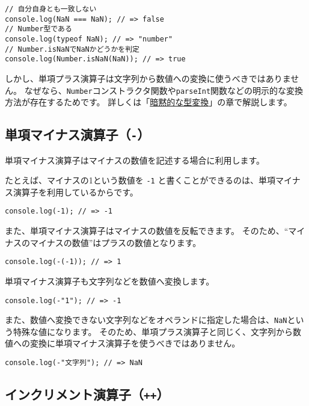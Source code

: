 \begin{lstlisting}
// 自分自身とも一致しない
console.log(NaN === NaN); // => false
// Number型である
console.log(typeof NaN); // => "number"
// Number.isNaNでNaNかどうかを判定
console.log(Number.isNaN(NaN)); // => true
\end{lstlisting}

しかし、単項プラス演算子は文字列から数値への変換に使うべきではありません。
なぜなら、\texttt{Number}コンストラクタ関数や\texttt{parseInt}関数などの明示的な変換方法が存在するためです。
詳しくは「\hyperlink{implicit-coercion}{暗黙的な型変換}」の章で解説します。

\hypertarget{unary-minus-operator}{%
\subsection{\texorpdfstring{単項マイナス演算子（\texttt{-}）}{単項マイナス演算子（-）}}\label{unary-minus-operator}}

単項マイナス演算子はマイナスの数値を記述する場合に利用します。

たとえば、マイナスの1という数値を \texttt{-1}
と書くことができるのは、単項マイナス演算子を利用しているからです。

\begin{lstlisting}
console.log(-1); // => -1
\end{lstlisting}

また、単項マイナス演算子はマイナスの数値を反転できます。
そのため、``マイナスのマイナスの数値''はプラスの数値となります。

\begin{lstlisting}
console.log(-(-1)); // => 1
\end{lstlisting}

単項マイナス演算子も文字列などを数値へ変換します。

\begin{lstlisting}
console.log(-"1"); // => -1
\end{lstlisting}

また、数値へ変換できない文字列などをオペランドに指定した場合は、\texttt{NaN}という特殊な値になります。
そのため、単項プラス演算子と同じく、文字列から数値への変換に単項マイナス演算子を使うべきではありません。

\begin{lstlisting}
console.log(-"文字列"); // => NaN
\end{lstlisting}

\hypertarget{increment-operator}{%
\subsection{\texorpdfstring{インクリメント演算子（\texttt{++}）}{インクリメント演算子（++）}}\label{increment-operator}}

